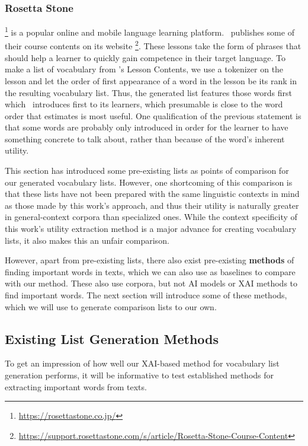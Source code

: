 \subsubsection{Rosetta Stone}
\Rosetta \footnote{\url{https://rosettastone.co.jp/}} is a popular online and mobile language learning platform.
\Rosetta\ publishes some of their course contents on its website \footnote{\url{https://support.rosettastone.com/s/article/Rosetta-Stone-Course-Content}}.
These lessons take the form of phrases that should help a learner to quickly gain competence in their target language.
To make a list of vocabulary from \Rosetta 's Lesson Contents, we use a tokenizer on the lesson and let the order of first appearance of a word in the lesson be its rank in the resulting vocabulary list.
Thus, the generated list features those words first which \Rosetta\ introduces first to its learners, which presumable is close to the word order that \Rosetta estimates is most useful.
One qualification of the previous statement is that some words are probably only introduced in order for the learner to have something concrete to talk about, rather than because of the word's inherent utility.



This section has introduced some pre-existing lists as points of comparison for our generated vocabulary lists.
However, one shortcoming of this comparison is that these lists have not been prepared with the same linguistic contexts in mind as those made by this work's approach, and thus their utility is naturally greater in general-context corpora than specialized ones.
While the context specificity of this work's utility extraction method is a major advance for creating vocabulary lists, it also makes this an unfair comparison.

However, apart from pre-existing lists, there also exist pre-existing \textbf{methods} of finding important words in texts, which we can also use as baselines to compare with our method.
These also use corpora, but not AI models or XAI methods to find important words.
The next section will introduce some of these methods, which we will use to generate comparison lists to our own.


\subsection{Existing List Generation Methods}
To get an impression of how well our XAI-based method for vocabulary list generation performs, it will be informative to test established methods for extracting important words from texts.

